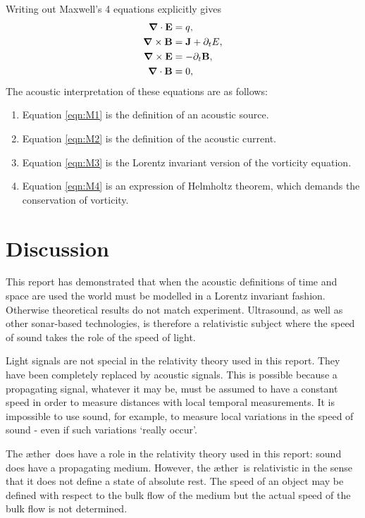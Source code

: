 \documentclass[10pt, fleqn,final,showtrims,oldfontcommands, article,a4paper,oneside]{memoir} %
\newcommand{\sub}[1]{\begin{subequations}#1\end{subequations}}
\newcommand{\eqa}[1]{\begin{align}#1\end{align}}
\newcommand{\eqnref}[1]{\ref{eqn:#1}}
\renewcommand{\d}{\partial}
\newcommand{\del}{\nabla}
\newcommand{\vdel}{ \mbox{\boldmath $\del$}}
\newcommand{\dt}{{\d_t}}
\newcommand{\aether}{\ae ther}
\newcommand{\vJ}{\vect J}
\newcommand{\vE}{\vect E}
\newcommand{\vB}{\vect B}
\newcommand{\vect}[1]{\mathbf{#1}}
\newcommand{\nlist}[1]
	   {  
	     \begin{enumerate}
	       #1
	     \end{enumerate} 
	   }
\begin{document}
Writing out Maxwell's 4 equations explicitly gives
\sub{
\eqa{
 \vdel \cdot \vE &= q,\label{eqn:M1}  \\ 
 \vdel \times \vB &= \vJ + \dt E, \label{eqn:M2}\\
 \vdel \times \vE &= -\dt\vB\label{eqn:M3},\\
 \vdel \cdot \vB &= 0\label{eqn:M4},
}
}
The acoustic interpretation of these equations are as follows:
\nlist{
\item Equation \eqnref{M1} is the definition of an acoustic source.
\item Equation \eqnref{M2} is the definition of the acoustic current.
\item Equation \eqnref{M3} is the Lorentz invariant version of the vorticity equation.
\item Equation \eqnref{M4} is an expression of Helmholtz theorem, which demands the conservation of vorticity.
}



\section{Discussion}\label{sec:discussion}

This report has demonstrated that when the acoustic definitions of time and space are used
the world must be modelled in a Lorentz invariant fashion.
Otherwise theoretical results do not match experiment.
Ultrasound, as well as other sonar-based technologies, is therefore a relativistic subject
where  the  speed of sound takes the role of the speed of light.

Light signals are not special in the relativity theory used in this report.
They have been completely replaced by acoustic signals.
This is possible because a propagating signal, whatever it may be,
must be assumed  to have a constant speed in order to measure distances with local temporal measurements.
It is impossible to use sound, for example,  to  measure local variations in the speed of sound - even if such variations `really occur'.

The \aether\ does have a role in the relativity theory used in this report:
sound does have a propagating medium.
However, the \aether\ is relativistic in the sense that it does not define a state of absolute rest. 
The speed of an object may be defined with respect to the bulk flow of the medium
but the actual speed of the bulk flow is not determined.
\end{document}

